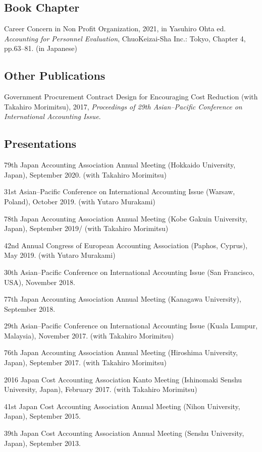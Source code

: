 \documentclass[letterpaper,uplatex]{article}
\renewenvironment{itemize}{
  \begin{list}{}{
    \setlength{\leftmargin}{1.5em}
  }
}{
  \end{list}
}
\begin{document}
\subsection*{Book Chapter}

\begin{itemize}
	\item Career Concern in Non Profit Organization, 2021, in Yasuhiro Ohta ed. \textit{Accounting for Personnel Evaluation}, ChuoKeizai-Sha Inc.: Tokyo, Chapter 4, pp.63--81. (in Japanese)
\end{itemize}


\subsection*{Other Publications}

\begin{itemize}
	\item Government Procurement Contract Design for Encouraging Cost Reduction (with Takahiro Morimitsu), 2017, \textit{Proceedings of 29th Asian--Pacific Conference on International Accounting Issue}.
\end{itemize}

\subsection*{Presentations}

\begin{itemize}
  \item 79th Japan Accounting Association Annual Meeting (Hokkaido University, Japan), September 2020. (with Takahiro Morimitsu)
  \item 31st Asian--Pacific Conference on International Accounting Issue (Warsaw, Poland), October 2019. (with Yutaro Murakami)
  \item 78th Japan Accounting Association Annual Meeting (Kobe Gakuin University, Japan), September 2019/ (with Takahiro Morimitsu)
  \item 42nd Annual Congress of European Accounting Association (Paphos, Cyprus), May 2019. (with Yutaro Murakami)
  \item 30th Asian--Pacific Conference on International Accounting Issue (San Francisco, USA), November 2018.
  \item 77th Japan Accounting Association Annual Meeting (Kanagawa University), September 2018.
  \item 29th Asian--Pacific Conference on International Accounting Issue (Kuala Lumpur, Malaysia), November 2017. (with Takahiro Morimitsu)
  \item 76th Japan Accounting Association Annual Meeting (Hiroshima University, Japan), September 2017. (with Takahiro Morimitsu)
  \item 2016 Japan Cost Accounting Association Kanto Meeting (Ishinomaki Senshu University, Japan), February 2017. (with Takahiro Morimitsu)
  \item 41st Japan Cost Accounting Association Annual Meeting (Nihon University, Japan), September 2015.
  \item 39th Japan Cost Accounting Association Annual Meeting (Senshu University, Japan), September 2013.
\end{itemize}
\end{document}
